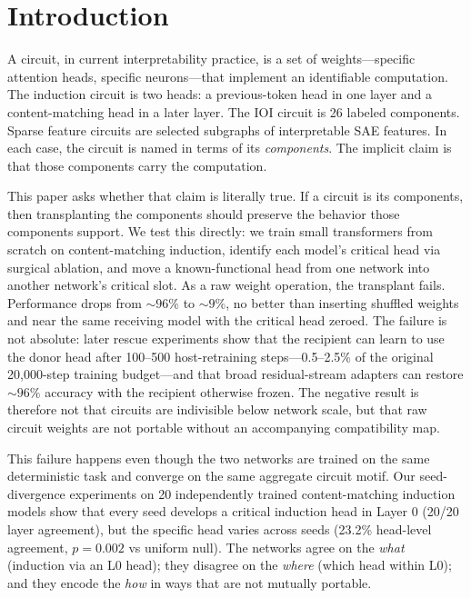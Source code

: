 \documentclass[final]{article}
\begin{document}
\section{Introduction}
\label{sec:intro}

A circuit, in current interpretability practice, is a set of weights---specific
attention heads, specific neurons---that implement an identifiable computation.
The induction circuit \citep{olsson2022induction} is two heads: a
previous-token head in one layer and a content-matching head in a later layer.
The IOI circuit \citep{wang2023ioi} is 26 labeled components. Sparse feature
circuits \citep{marks2024sparse} are selected subgraphs of interpretable SAE
features. In each case, the circuit is named in terms of its \emph{components}.
The implicit claim is that those components carry the computation.

This paper asks whether that claim is literally true. If a circuit is its
components, then transplanting the components should preserve the behavior those
components support. We
test this directly: we train small transformers from scratch on content-matching
induction, identify each model's critical head via surgical ablation, and move a
known-functional head from one network into another network's critical slot.
As a raw weight operation, the transplant fails. Performance drops from
${\sim}96\%$ to ${\sim}9\%$, no better than inserting shuffled weights and
near the same receiving model with the critical head zeroed. The failure is
not absolute: later rescue experiments show that the recipient can learn to
use the donor head after 100--500 host-retraining steps---0.5--2.5\% of the
original 20,000-step training budget---and that broad residual-stream adapters
can restore ${\sim}96\%$ accuracy with the recipient otherwise frozen. The
negative result is therefore not that circuits are
indivisible below network scale, but that raw circuit weights are not portable
without an accompanying compatibility map.

This failure happens even though the two networks are trained on the same
deterministic task and converge on the same aggregate circuit motif. Our
seed-divergence experiments on 20 independently trained content-matching
induction models show that every seed develops a critical induction head in
Layer 0 (20/20 layer agreement), but the specific head varies across seeds
(23.2\% head-level agreement, $p=0.002$ vs uniform null). The networks agree on
the \emph{what} (induction via an L0 head); they disagree on
the \emph{where} (which head within L0); and they encode the \emph{how} in
ways that are not mutually portable.
\end{document}
